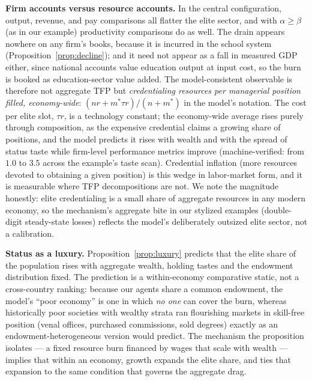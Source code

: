 \documentclass[12pt,letterpaper]{article}
\theoremstyle{definition}
\begin{document}
\textbf{Firm accounts versus resource accounts.}
In the central configuration, output, revenue, and pay comparisons all flatter the elite sector, and with $\alpha\geq\beta$ (as in our example) productivity comparisons do as well.
The drain appears nowhere on any firm's books, because it is incurred in the school system (Proposition~\ref{prop:decline}); and it need not appear as a fall in measured GDP either, since national accounts value education output at input cost, so the burn is booked as education-sector value added.
The model-consistent observable is therefore not aggregate TFP but \emph{credentialing resources per managerial position filled, economy-wide}: $(nr+m^\ast\tau r)/(n+m^\ast)$ in the model's notation.
The cost per elite slot, $\tau r$, is a technology constant; the economy-wide average rises purely through composition, as the expensive credential claims a growing share of positions, and the model predicts it rises with wealth and with the spread of status taste while firm-level performance metrics improve (machine-verified: from $1.0$ to $3.5$ across the example's taste scan).
Credential inflation (more resources devoted to obtaining a given position) is this wedge in labor-market form, and it is measurable where TFP decompositions are not.
We note the magnitude honestly: elite credentialing is a small share of aggregate resources in any modern economy, so the mechanism's aggregate bite in our stylized examples (double-digit steady-state losses) reflects the model's deliberately outsized elite sector, not a calibration.

\textbf{Status as a luxury.}
Proposition~\ref{prop:luxury} predicts that the elite share of the population rises with aggregate wealth, holding tastes and the endowment distribution fixed.
The prediction is a within-economy comparative static, not a cross-country ranking: because our agents share a common endowment, the model's ``poor economy'' is one in which \emph{no one} can cover the burn, whereas historically poor societies with wealthy strata ran flourishing markets in skill-free position (venal offices, purchased commissions, sold degrees) exactly as an endowment-heterogeneous version would predict.
The mechanism the proposition isolates --- a fixed resource burn financed by wages that scale with wealth --- implies that within an economy, growth expands the elite share, and ties that expansion to the same condition that governs the aggregate drag.
\end{document}
